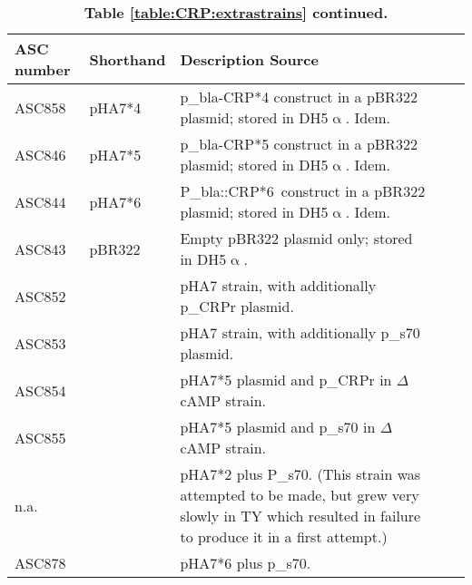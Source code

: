 \begin{table}[h]
    \begin{tabularx}{\textwidth}{llXll}
        	\textbf{ASC number}	& \textbf{Shorthand} & \textbf{Description}	\textbf{Source} \\
        \hline
ASC858	&	pHA7*4	& p\_bla-CRP*4 construct in a pBR322 plasmid; stored in DH5$\upalpha$. Idem. & \cite{Aiba1985, Towbin2017} \\
ASC846	&	pHA7*5	& p\_bla-CRP*5 construct in a pBR322 plasmid; stored in DH5$\upalpha$. Idem. & \cite{Aiba1985, Towbin2017} \\
ASC844	&	pHA7*6	& P\_bla::CRP*6 construct in a pBR322 plasmid; stored in DH5$\upalpha$.  Idem. & \cite{Aiba1985, Towbin2017} \\
ASC843	&	pBR322	& Empty pBR322 plasmid only; stored in DH5$\upalpha$. & \cite{Towbin2017}\\
%                        
ASC852	&	& pHA7 strain, with additionally p\_CRPr plasmid. & \\
ASC853	&	& pHA7 strain, with additionally p\_s70 plasmid. & \\
ASC854	&	& pHA7*5 plasmid and p\_CRPr in $\Delta$cAMP strain. & \\
ASC855	&	& pHA7*5 plasmid and p\_s70 in $\Delta$cAMP strain. & \\
%
n.a.	&		& pHA7*2 plus P\_s70. (This strain was attempted to be made, but grew very slowly in TY which resulted in failure to produce it in a first attempt.)  & \\
ASC878	&		& pHA7*6 plus p\_s70. & \\
	\end{tabularx}
	\caption{\textbf{Table \ref{table:CRP:extrastrains} continued.}}
\end{table}

